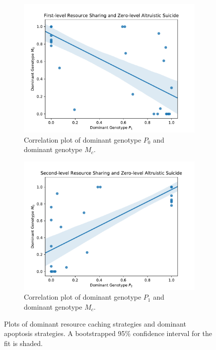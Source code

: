 \begin{figure}[t]
\begin{center}

\begin{subfigure}[b]{0.5\columnwidth}
  \includegraphics[width=\columnwidth]{img/champion_res_pool1_vs_champion_damage_suicide0}
  \caption{
  Correlation plot of dominant genotype $P_0$ and dominant genotype $M_{c}$.
  }
  \label{fig:champion_res_pool1_vs_champion_damage_suicide0}
\end{subfigure}%
\begin{subfigure}[b]{0.5\columnwidth}
  \includegraphics[width=\columnwidth]{img/champion_res_pool2_vs_champion_damage_suicide0}
  \caption{
  Correlation plot of dominant genotype $P_1$ and dominant genotype $M_{c}$.
  }
  \label{fig:champion_res_pool2_vs_champion_damage_suicide0}
\end{subfigure}

\caption{
Plots of dominant resource caching strategies and dominant apoptosis strategies.
A bootstrapped 95\% confidence interval for the fit is shaded.
}
\label{fig:damage_suicide}
\end{center}
\end{figure}

